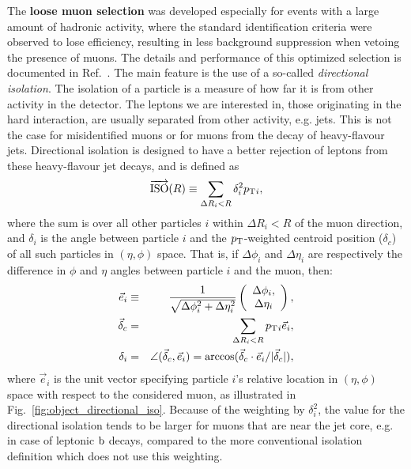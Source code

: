 The \textbf{loose muon selection} was developed especially for events with a
large amount of hadronic activity, where the standard identification criteria were observed to lose
efficiency, resulting in less background suppression when vetoing the presence of muons. 
The details and performance of this optimized selection is documented in
Ref.~\cite{CMS-AN2011-498}. 
The main feature is the use of a so-called \textit{directional isolation}.
The isolation of a particle is a measure of how far it is from other activity in the detector. The
leptons we are interested in, those originating in the hard interaction, are usually separated from
other activity, e.g. jets. This is not the case for misidentified muons or for muons from the decay
of heavy-flavour jets. Directional isolation is designed to have a better rejection of leptons from
these heavy-flavour jet decays, and is defined as
\begin{equation}
\overrightarrow{\mathrm{ISO}}(R) \equiv \sum_{\Delta R_{i} < R} \delta_{i}^{2}p_{\mathrm{T}}{}_{i} ,
\end{equation}
where the sum is over all other particles $i$ within $\Delta R_{i}<R$ of the muon direction,
and $\delta_{i}$ is the angle between particle $i$ and the $p_{\mathrm{T}}$-weighted centroid position
($\delta_{c}$) of all such particles in $(\eta,\phi)$ space. That is, if $\Delta\phi_i$ and
$\Delta\eta_i$ are respectively the difference in $\phi$ and $\eta$ angles between particle $i$ and
the muon, then:
\begin{eqnarray*}
\vec{e}_{i} & \equiv & \frac{1}{\sqrt{\Delta\phi_{i}^{2}+\Delta\eta_{i}^{2}}}\left(\begin{array}{c}
\Delta\phi_{i},\\
\Delta\eta_{i}
\end{array}\right),\\
\vec{\delta}_{c} & = & \sum_{\Delta R_{i}<R}p_{\mathrm{T}}{}_{i}\vec{e}_{i},\\
\delta_{i} & = &
\angle(\vec{\delta}_{c},\vec{e}_{i})=\arccos(\vec{\delta}_{c}\cdot\vec{e}_{i}/|\vec{\delta}_{c}|),
\end{eqnarray*}
where $\vec{e}_{i}$ is the unit vector specifying particle $i$'s relative location in $(\eta,\phi)$
space with respect to the considered muon, as illustrated in Fig.~\ref{fig:object_directional_iso}.
Because of the weighting by $\delta_{i}^{2}$, the value for the directional isolation tends to be
larger for muons that are near the jet core, e.g. in case of leptonic $\mathrm{b}$ decays, compared to
the more conventional isolation definition which does not use this weighting. 

